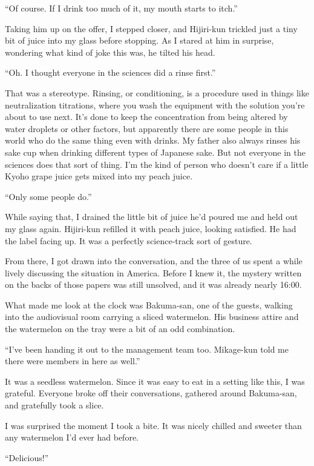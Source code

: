\documentclass[
    a4paper,
    12pt,
    twoside,
    openany,
    UTF8,
    fontset=windows
]{ctexbook}
\begin{document}
``Of course. If I drink too much of it, my mouth starts to itch.''

Taking him up on the offer, I stepped closer, and Hijiri-kun trickled just a tiny bit of juice into my glass before stopping. As I stared at him in surprise, wondering what kind of joke this was, he tilted his head.

``Oh. I thought everyone in the sciences did a rinse first.''

That was a stereotype. Rinsing, or conditioning, is a procedure used in things like neutralization titrations, where you wash the equipment with the solution you're about to use next. It's done to keep the concentration from being altered by water droplets or other factors, but apparently there are some people in this world who do the same thing even with drinks. My father also always rinses his sake cup when drinking different types of Japanese sake. But not everyone in the sciences does that sort of thing. I'm the kind of person who doesn't care if a little Kyoho grape juice gets mixed into my peach juice.

``Only some people do.''

While saying that, I drained the little bit of juice he'd poured me and held out my glass again. Hijiri-kun refilled it with peach juice, looking satisfied. He had the label facing up. It was a perfectly science-track sort of gesture.

From there, I got drawn into the conversation, and the three of us spent a while lively discussing the situation in America. Before I knew it, the mystery written on the backs of those papers was still unsolved, and it was already nearly 16:00.

What made me look at the clock was Bakuma-san, one of the guests, walking into the audiovisual room carrying a sliced watermelon. His business attire and the watermelon on the tray were a bit of an odd combination.

``I've been handing it out to the management team too. Mikage-kun told me there were members in here as well.''

It was a seedless watermelon. Since it was easy to eat in a setting like this, I was grateful. Everyone broke off their conversations, gathered around Bakuma-san, and gratefully took a slice.

I was surprised the moment I took a bite. It was nicely chilled and sweeter than any watermelon I'd ever had before.

``Delicious!''
\end{document}
